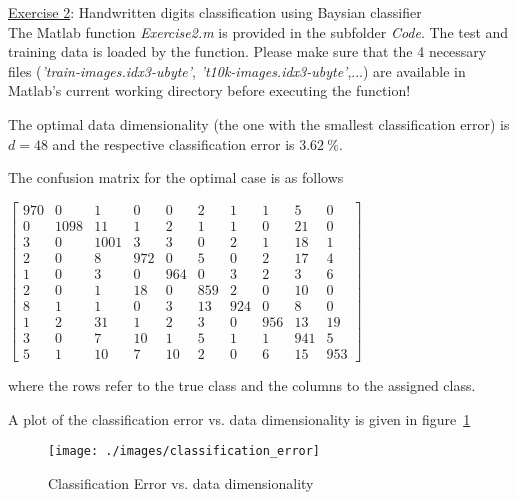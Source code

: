 \FloatBarrier
\newpage

\ul{Exercise 2}: Handwritten digits classification using Baysian classifier \\[3mm]

The Matlab function \textit{Exercise2.m} is provided
in the subfolder \textit{Code}. The test and training data is loaded
by the function. Please make sure that the 4 necessary files
(\textit{'train-images.idx3-ubyte'},
\textit{'t10k-images.idx3-ubyte'},...) are available in Matlab's current working directory before executing the function!

The optimal data dimensionality (the one with the smallest classification error) is $d = 48$ and the respective classification error is $3.62~\%$.


The confusion matrix for the optimal case is as follows

\begin{center}
$
\begin{bmatrix}
	970 & 0 & 1 & 0 & 0 & 2 & 1 & 1 & 5 & 0 \\
	0 & 1098 & 11 & 1 & 2 & 1 & 1 & 0 & 21 & 0 \\
	3 & 0 & 1001 & 3 & 3 & 0 & 2 & 1 & 18 & 1 \\
	2 & 0 & 8 & 972 & 0 & 5 & 0 & 2 & 17 & 4 \\
	1 & 0 & 3 & 0 & 964 & 0 & 3 & 2 & 3 & 6 \\
	2 & 0 & 1 & 18 & 0 & 859 & 2 & 0 & 10 & 0 \\
	8 & 1 & 1 & 0 & 3 & 13 & 924 & 0 & 8 & 0 \\
	1 & 2 & 31 & 1 & 2 & 3 & 0 & 956 & 13 & 19 \\
	3 & 0 & 7 & 10 & 1 & 5 & 1 & 1 & 941 & 5 \\
	5 & 1 & 10 & 7 & 10 & 2 & 0 & 6 & 15 & 953
\end{bmatrix}\label{eqn:confusion_matrix}
$
\end{center}

where the rows refer to the true class and the columns to the assigned class.

A plot of the classification error vs. data dimensionality is given in figure~\ref{fig:classification_error_over_d}

\begin{figure}[hbtp]
  \centering
  \texttt{[image: ./images/classification\_error]}
  \caption{Classification Error vs. data dimensionality}
  \label{fig:classification_error_over_d}
\end{figure}

